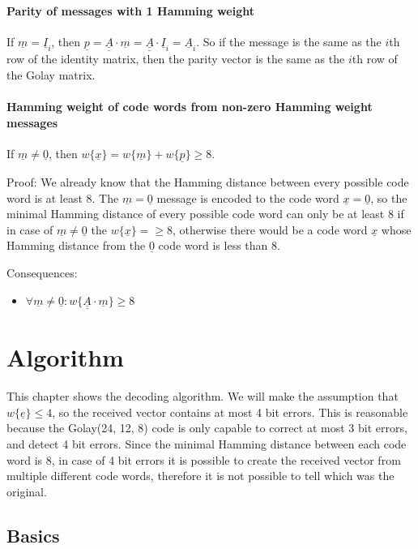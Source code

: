 \documentclass[11pt,a4paper,oneside]{report}             %
\def\doubleunderline#1{\underline{\underline{#1}}}
\def\dul#1{\doubleunderline{#1}}
\def\ul#1{\underline{#1}}
\begin{document}
\subsubsection{Parity of messages with 1 Hamming weight}

If $\ul{m} = \ul{I}_{i}$, then $\ul{p} = \dul{A} \cdot \ul{m} = \dul{A} \cdot \ul{I}_{i} = \ul{A}_{i}$.
So if the message is the same as the $i$th row of the identity matrix, then the parity vector is the
same as the $i$th row of the Golay matrix.

\subsubsection{Hamming weight of code words from non-zero Hamming weight messages}

If $\ul{m} \neq \ul{0}$, then $w\{ \ul{x} \} = w\{ \ul{m} \} + w\{ \ul{p} \} \geq 8$.

Proof:
We already know that the Hamming distance between every possible code word is at least 8.
The $\ul{m} = \ul{0}$ message is encoded to the code word $\ul{x} = \ul{0}$, so
the minimal Hamming distance of every possible code word can only be at least 8 if
in case of $\ul{m} \neq \ul{0}$ the $w\{ \ul{x} \} = \geq 8$, otherwise there
would be a code word $\ul{x}$ whose Hamming distance from the $\ul{0}$ code word is less than 8.

Consequences:
\begin{itemize}
    \item $\forall \ul{m} \neq \ul{0} : w\{ \dul{A} \cdot \ul{m} \} \geq 8$
\end{itemize}

\chapter{Algorithm}

This chapter shows the decoding algorithm. We will make the assumption that $w\{\ul{e}\} \leq 4$,
so the received vector contains at most 4 bit errors. This is reasonable because the Golay(24, 12, 8)
code is only capable to correct at most 3 bit errors, and detect 4 bit errors. Since the minimal
Hamming distance between each code word is 8, in case of 4 bit errors it is possible to create the
received vector from multiple different code words, therefore it is not possible to tell which was
the original.

\section{Basics}
\end{document}
